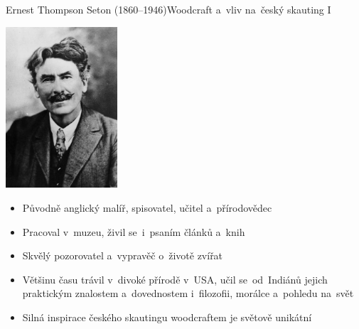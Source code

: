 \documentclass[compress, ucs, xelatex, 11pt, xcolor=dvipsnames, print, aspectratio=169,
	hyperref={
		bookmarks=true,
		unicode=true,
		colorlinks=true,
		pdftitle={Skautska vychovna metoda},
		plainpages=false,
		pdfauthor={Vojtech Zeisek},
		pdfsubject={Skautska vychovna metoda a jeji vyvoj za posledni stoleti a desetileti},
		pdfcreator={XeLaTeX},
		pdfkeywords={Junak, Pedagogika, Skaut, Skauting, Vychovna metoda},
		linkcolor=Red, %
		anchorcolor=ForestGreen, %
		citecolor=ForestGreen, %
		filecolor=ForestGreen, %
		menucolor=ForestGreen, %
		urlcolor=Sepia, %
		pdftex},
	url={hyphens, lowtilde} %
	]{beamer}
\begin{document}
\begin{frame}{Ernest Thompson Seton (1860--1946)}{Woodcraft a~vliv na~český skauting I}
	\begin{multicols}{2}
		\begin{center}
			\includegraphics[height=6cm]{seton.jpg}
		\end{center}
		\columnbreak
		\begin{itemize}
			\item Původně anglický malíř, spisovatel, učitel a~přírodovědec
			\item Pracoval v~muzeu, živil se~i~psaním článků a~knih
			\item Skvělý pozorovatel a~vypravěč o~životě zvířat
			\item Většinu času trávil v~divoké přírodě v~USA, učil se~od~Indiánů jejich praktickým znalostem a~dovednostem i~filozofii, morálce a~pohledu na~svět
			\item Silná inspirace českého skautingu woodcraftem je světově unikátní
		\end{itemize}
	\end{multicols}
\end{frame}
\end{document}
